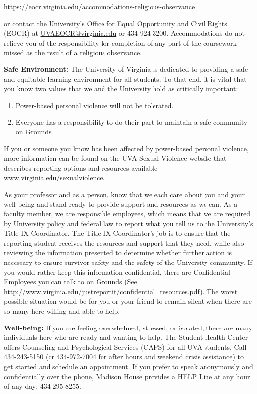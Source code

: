 \documentclass[12pt]{article}
\begin{document}
\begin{center} 
    \url{https://eocr.virginia.edu/accommodations-religious-observance}
\end{center}

or contact the University's Office for Equal Opportunity and Civil Rights (EOCR) at \url{UVAEOCR@virginia.edu} or 434-924-3200.  Accommodations do not relieve you of the responsibility for completion of any part of the coursework missed as the result of a religious observance.

\textbf{Safe Environment:} The University of Virginia is dedicated to providing a safe and equitable learning environment for all students. To that end, it is vital that you know two values that we and the University hold as critically important:
 
\begin{enumerate}
    \item Power-based personal violence will not be tolerated. 
    \item Everyone has a responsibility to do their part to maintain a safe community on Grounds.
\end{enumerate}

If you or someone you know has been affected by power-based personal violence, more information can be found on the UVA Sexual Violence website that describes reporting options and resources available -- \url{www.virginia.edu/sexualviolence}. 
   
As your professor and as a person, know that we each care about you and your well-being and stand ready to provide support and resources as we can. As a faculty member, we are responsible employees, which means that we are required by University policy and federal law to report what you tell us to the University's Title IX Coordinator. The Title IX Coordinator's job is to ensure that the reporting student receives the resources and support that they need, while also reviewing the information presented to determine whether further action is necessary to ensure survivor safety and the safety of the University community. If you would rather keep this information confidential, there are Confidential Employees you can talk to on Grounds (See \url{http://www.virginia.edu/justreportit/confidential\_resources.pdf}). The worst possible situation would be for you or your friend to remain silent when there are so many here willing and able to help.

\textbf{Well-being:} If you are feeling overwhelmed, stressed, or isolated, there are many individuals here who are ready and wanting to help. The Student Health Center offers Counseling and Psychological Services (CAPS) for all UVA students. Call 434-243-5150 (or 434-972-7004 for after hours and weekend crisis assistance) to get started and schedule an appointment. If you prefer to speak anonymously and confidentially over the phone, Madison House provides a HELP Line at any hour of any day: 434-295-8255.
\end{document}
